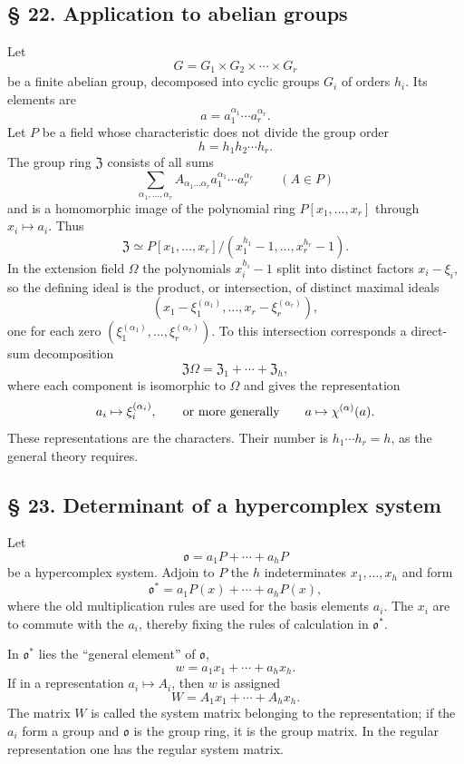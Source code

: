 \documentclass[11pt]{article}
\providecommand{\mo}{\mathfrak{o}}
\providecommand{\mZ}{\mathfrak{Z}}
\begin{document}
\subsection*{§ 22. Application to abelian groups}
Let
\[
        G=G_1\times G_2\times\cdots\times G_r
\]
be a finite abelian group, decomposed into cyclic groups $G_i$ of orders $h_i$. Its elements are
\[
        a=a_1^{\alpha_1}\cdots a_r^{\alpha_r}.
\]
Let $P$ be a field whose characteristic does not divide the group order
\[
        h=h_1h_2\cdots h_r.
\]
The group ring $\mZ$ consists of all sums
\[
        \sum_{\alpha_1,\ldots,\alpha_r} A_{\alpha_1\ldots\alpha_r}
        a_1^{\alpha_1}\cdots a_r^{\alpha_r}
        \qquad (A\in P)
\]
and is a homomorphic image of the polynomial ring $P[x_1,\ldots,x_r]$ through $x_i\mapsto a_i$. Thus
\[
        \mZ\simeq P[x_1,\ldots,x_r]/(x_1^{h_1}-1,\ldots,x_r^{h_r}-1).
\]
In the extension field $\Omega$ the polynomials $x_i^{h_i}-1$ split into distinct factors $x_i-\xi_i$, so the defining ideal is the product, or intersection, of distinct maximal ideals
\[
        (x_1-\xi_1^{(\alpha_1)},\ldots,x_r-\xi_r^{(\alpha_r)}),
\]
one for each zero $(\xi_1^{(\alpha_1)},\ldots,\xi_r^{(\alpha_r)})$. To this intersection corresponds a direct-sum decomposition
\[
        \mZ\Omega=\mZ_1+\cdots+\mZ_h,
\]
where each component is isomorphic to $\Omega$ and gives the representation
\[
        a_i\mapsto \xi_i^{(\alpha_i)},
        \qquad\hbox{or more generally}\qquad
        a\mapsto \chi^{(\alpha)}(a).
\]
These representations are the characters. Their number is $h_1\cdots h_r=h$, as the general theory requires.

\subsection*{§ 23. Determinant of a hypercomplex system}
Let
\[
        \mo=a_1P+\cdots+a_hP
\]
be a hypercomplex system. Adjoin to $P$ the $h$ indeterminates $x_1,\ldots,x_h$ and form
\[
        \mo^*=a_1P(x)+\cdots+a_hP(x),
\]
where the old multiplication rules are used for the basis elements $a_i$. The $x_i$ are to commute with the $a_i$, thereby fixing the rules of calculation in $\mo^*$.

In $\mo^*$ lies the ``general element'' of $\mo$,
\[
        w=a_1x_1+\cdots+a_hx_h.
\]
If in a representation $a_i\mapsto A_i$, then $w$ is assigned
\[
        W=A_1x_1+\cdots+A_hx_h.
\]
The matrix $W$ is called the system matrix belonging to the representation; if the $a_i$ form a group and $\mo$ is the group ring, it is the group matrix. In the regular representation one has the regular system matrix.
\end{document}
